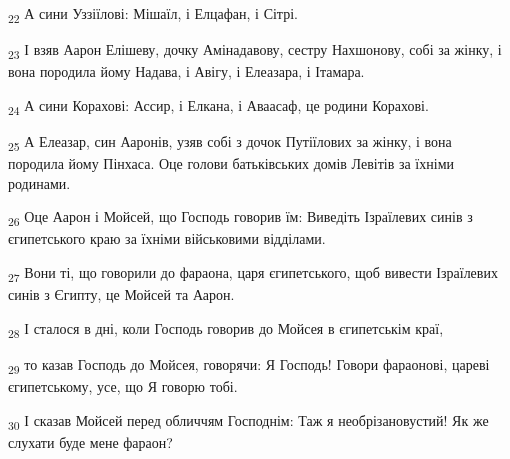 \begin{tcolorbox}
\textsubscript{22} А сини Уззіїлові: Мішаїл, і Елцафан, і Сітрі.
\end{tcolorbox}
\begin{tcolorbox}
\textsubscript{23} І взяв Аарон Елішеву, дочку Амінадавову, сестру Нахшонову, собі за жінку, і вона породила йому Надава, і Авігу, і Елеазара, і Ітамара.
\end{tcolorbox}
\begin{tcolorbox}
\textsubscript{24} А сини Корахові: Ассир, і Елкана, і Аваасаф, це родини Корахові.
\end{tcolorbox}
\begin{tcolorbox}
\textsubscript{25} А Елеазар, син Ааронів, узяв собі з дочок Путіїлових за жінку, і вона породила йому Пінхаса. Оце голови батьківських домів Левітів за їхніми родинами.
\end{tcolorbox}
\begin{tcolorbox}
\textsubscript{26} Оце Аарон і Мойсей, що Господь говорив їм: Виведіть Ізраїлевих синів з єгипетського краю за їхніми військовими відділами.
\end{tcolorbox}
\begin{tcolorbox}
\textsubscript{27} Вони ті, що говорили до фараона, царя єгипетського, щоб вивести Ізраїлевих синів з Єгипту, це Мойсей та Аарон.
\end{tcolorbox}
\begin{tcolorbox}
\textsubscript{28} І сталося в дні, коли Господь говорив до Мойсея в єгипетськім краї,
\end{tcolorbox}
\begin{tcolorbox}
\textsubscript{29} то казав Господь до Мойсея, говорячи: Я Господь! Говори фараонові, цареві єгипетському, усе, що Я говорю тобі.
\end{tcolorbox}
\begin{tcolorbox}
\textsubscript{30} І сказав Мойсей перед обличчям Господнім: Таж я необрізановустий! Як же слухати буде мене фараон?
\end{tcolorbox}
